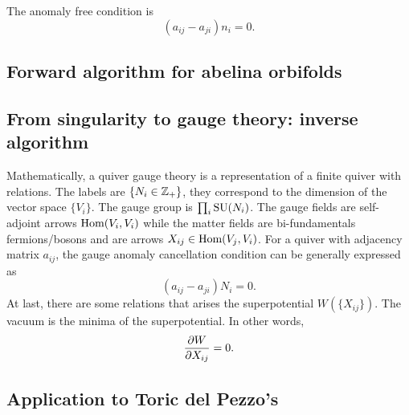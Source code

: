         The anomaly free condition is
        \begin{equation}
            (a_{ij}-a_{ji})n_i=0.
        \end{equation}

    \subsection{Forward algorithm for abelina orbifolds}

        

    \subsection{From singularity to gauge theory: inverse algorithm}

        Mathematically, a quiver gauge theory is a representation of a finite quiver with relations. The labels are $\{N_i\in\mathbb{Z}_+\}$, they correspond to the dimension of the vector space $\{V_i\}$. The gauge group is $\prod_i\text{SU}(N_i)$. The gauge fields are self-adjoint arrows $\text{Hom}(V_i,V_i)$ while the matter fields are bi-fundamentals fermions/bosons and are arrows $X_{ij}\in\text{Hom}(V_j,V_i)$. For a quiver with adjacency matrix $a_{ij}$, the gauge anomaly cancellation condition can be generally expressed as
        \begin{equation}
            (a_{ij}-a_{ji})N_i=0.
        \end{equation}
        At last, there are some relations that arises the superpotential $W(\{X_{ij}\})$. The vacuum is the minima of the superpotential. In other words,
        \begin{equation}
            \pdv{W}{X_{ij}}=0.
        \end{equation}

    \subsection{Application to Toric del Pezzo's}

